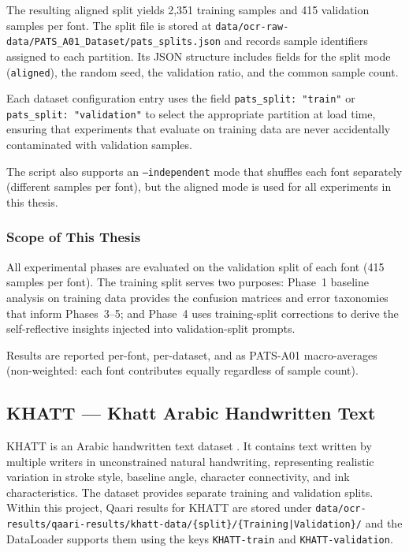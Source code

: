 The resulting aligned split yields 2,351 training samples and 415 validation
samples per font. The split file is stored at
\texttt{data/ocr-raw-data/PATS\_A01\_Dataset/pats\_splits.json}
and records sample identifiers assigned to each partition. Its JSON structure
includes fields for the split mode (\texttt{aligned}), the random seed, the
validation ratio, and the common sample count.

Each dataset configuration entry uses the field
\texttt{pats\_split: "train"} or \texttt{pats\_split: "validation"}
to select the appropriate partition at load time, ensuring that experiments
that evaluate on training data are never accidentally contaminated with
validation samples.

The script also supports an \texttt{--independent} mode that shuffles each
font separately (different samples per font), but the aligned mode is used
for all experiments in this thesis.

\subsubsection{Scope of This Thesis}

All experimental phases are evaluated on the validation split of each font
(415 samples per font). The training split serves two purposes: Phase~1
baseline analysis on training data provides the confusion matrices and error
taxonomies that inform Phases~3--5; and Phase~4 uses training-split
corrections to derive the self-reflective insights injected into
validation-split prompts.

Results are reported per-font, per-dataset, and as PATS-A01 macro-averages
(non-weighted: each font contributes equally regardless of sample count).

\subsection{KHATT --- Khatt Arabic Handwritten Text}
\label{subsec:khatt}

KHATT is an Arabic handwritten text dataset \cite{mahmoud2014khatt}.
It contains text written by multiple writers in unconstrained natural handwriting,
representing realistic variation in stroke style, baseline angle, character
connectivity, and ink characteristics.
The dataset provides separate training and validation splits.
Within this project, Qaari results for KHATT are stored under
\texttt{data/ocr-results/qaari-results/khatt-data/\{split\}/\{Training|Validation\}/}
and the DataLoader supports them using the keys \texttt{KHATT-train} and
\texttt{KHATT-validation}.

